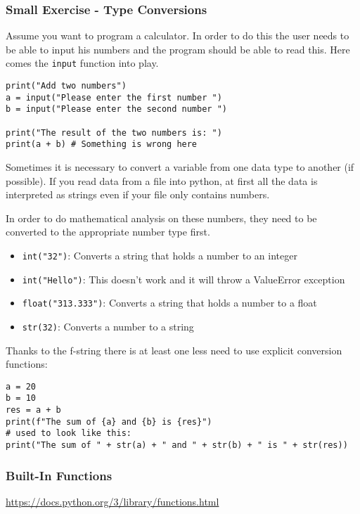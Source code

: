 \documentclass[10pt, a4paper]{beamer} %
\begin{document}
\begin{frame}
	\frametitle{Small Exercise - Type Conversions}

	Assume you want to program a calculator.
	In order to do this the user needs to be able to input his numbers and the program should be able to read this.
	Here comes the \lstinline!input! function into play.

	\begin{lstlisting}
print("Add two numbers")
a = input("Please enter the first number ")
b = input("Please enter the second number ")

print("The result of the two numbers is: ")
print(a + b) # Something is wrong here
\end{lstlisting}


	\framebreak
	Sometimes it is necessary to convert a variable from one data type to another (if possible). If you
	read data from a file into python, at first all the data is interpreted as strings even if your file only
	contains numbers.

	In order to do mathematical analysis on these numbers, they need to be converted to the appropriate number type first.

	\begin{itemize}
		\item \lstinline!int("32")!: Converts a string that holds a number to an integer
		\item \lstinline!int("Hello")!: This doesn't work and it will throw a ValueError exception
		\item \lstinline!float("313.333")!: Converts a string that holds a number to a float
		\item \lstinline!str(32)!: Converts a number to a string
	\end{itemize}

	Thanks to the f-string there is at least one less need to use explicit conversion functions:
	\begin{examples}
		\begin{lstlisting}
a = 20
b = 10
res = a + b
print(f"The sum of {a} and {b} is {res}")
# used to look like this:
print("The sum of " + str(a) + " and " + str(b) + " is " + str(res))
\end{lstlisting}
	\end{examples}
\end{frame}

\begin{frame}[c]\frametitle{Built-In Functions}
	\url{https://docs.python.org/3/library/functions.html}
\end{frame}
\end{document}
